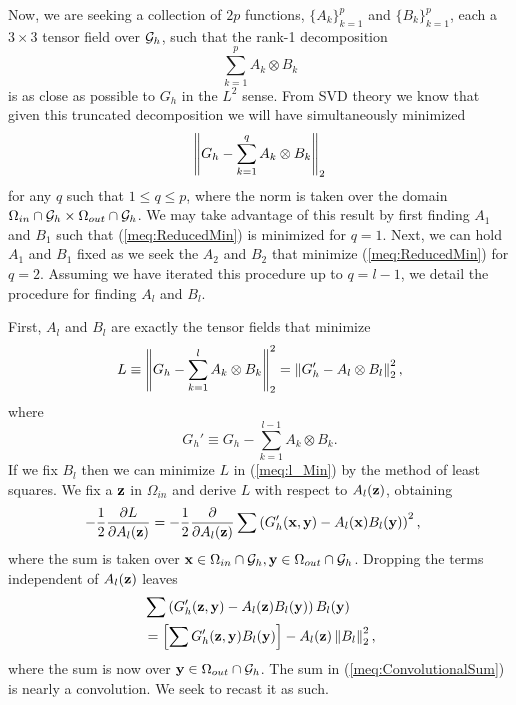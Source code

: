 Now, we are seeking a collection of $2p$ functions, $\{A_k\}_{k=1}^p$ and $\{B_k\}_{k=1}^p$, each a $3\times 3$ tensor field over $\mathcal{G}_h$, such that the rank-1 decomposition
\begin{equation}
\sum_{k=1}^{p} A_k \otimes B_k
\end{equation}
is as close as possible to $G_h$ in the $L^2$ sense. From SVD theory we know that given this truncated decomposition we will have simultaneously minimized 
\begin{equation}
\left\lVert G_h - \sum_{k = 1}^q A_k \otimes B_k\right\rVert_2
\label{meq:ReducedMin}
\end{equation}
for any $q$ such that $1\leq q \leq p$, where the norm is taken over the domain $\Omega_{in}\cap\mathcal{G}_h\times\Omega_{out}\cap\mathcal{G}_h$. We may take advantage of this result by first finding $A_1$ and $B_1$ such that (\ref{meq:ReducedMin}) is minimized for $q=1$. Next, we can hold $A_1$ and $B_1$ fixed as we seek the $A_2$ and $B_2$ that minimize (\ref{meq:ReducedMin}) for $q=2$. Assuming we have iterated this procedure up to $q = l-1$, we detail the procedure for finding $A_l$ and $B_l$.

First, $A_l$ and $B_l$ are exactly the tensor fields that minimize
\begin{equation}
L\equiv \left\lVert G_h - \sum_{k = 1}^{l} A_k\otimes B_k\right\rVert_2^2 = \left\lVert G_h' - A_l\otimes B_l\right\rVert_2^2,
\label{meq:l_Min}
\end{equation}
where
\begin{equation}
G_h'\equiv G_h - \sum_{k = 1}^{l-1} A_k\otimes B_k.
\end{equation}
If we fix $B_l$ then we can minimize $L$ in (\ref{meq:l_Min}) by the method of least squares.  We fix a $\mathbf{z}$ in $\Omega_{in}$ and derive $L$ with respect to $A_l(\mathbf{z})$, obtaining
\begin{align}
-\frac{1}{2} \frac{\partial L}{\partial A_l(\mathbf{z})}
&=
-\frac{1}{2} \frac{\partial}{\partial A_l(\mathbf{z})} \sum \left(G_h'(\mathbf{x},\mathbf{y}) - A_l(\mathbf{x})B_l(\mathbf{y})\right)^2,
\end{align}
where the sum is taken over $\mathbf{x}\in\Omega_{in}\cap\mathcal{G}_h,\mathbf{y}\in\Omega_{out}\cap\mathcal{G}_h$. Dropping the terms independent of  $A_l(\mathbf{z})$ leaves
\begin{align}
&
\sum \left(G_h'(\mathbf{z},\mathbf{y}) - A_l(\mathbf{z})B_l(\mathbf{y})\right)B_l(\mathbf{y}) \nonumber \\
&=
\left[ \sum G_h'(\mathbf{z},\mathbf{y})B_l(\mathbf{y}) \right] - A_l(\mathbf{z})\left\lVert B_l\right\rVert_2^2,
\label{meq:ConvolutionalSum}
\end{align}
where the sum is now over $\mathbf{y}\in\Omega_{out}\cap\mathcal{G}_h$. The sum in (\ref{meq:ConvolutionalSum}) is  nearly a convolution. We seek to recast it as such.

